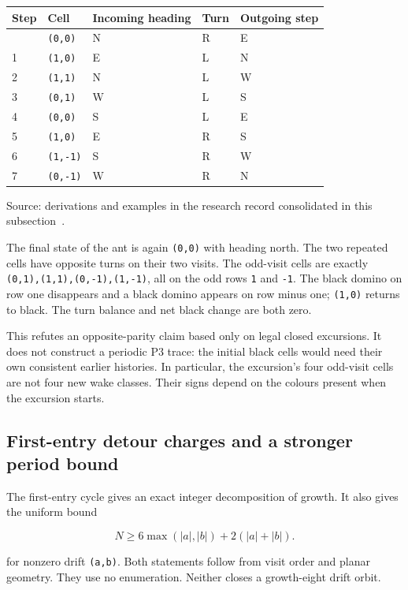 \documentclass[11pt,letterpaper]{article}
\theoremstyle{plain}
\theoremstyle{definition}
\begin{document}
\begin{NoHyper}
{\def\LTcaptype{table} %
\begin{longtable}[]{@{}lllll@{}}
\toprule\noalign{}
Step & Cell & Incoming heading & Turn & Outgoing step \\
\midrule\noalign{}
\endhead
\bottomrule\noalign{}
\endlastfoot
0 & \texttt{(0,0)} & N & R & E \\
1 & \texttt{(1,0)} & E & L & N \\
2 & \texttt{(1,1)} & N & L & W \\
3 & \texttt{(0,1)} & W & L & S \\
4 & \texttt{(0,0)} & S & L & E \\
5 & \texttt{(1,0)} & E & R & S \\
6 & \texttt{(1,-1)} & S & R & W \\
7 & \texttt{(0,-1)} & W & R & N \\
\end{longtable}
{\footnotesize Source: derivations and examples in the research record consolidated in this subsection~\cite{Repo}.\par}
}

The final state of the ant is again \texttt{(0,0)} with heading north. The two repeated cells have opposite turns on their two visits. The odd-visit cells are exactly \texttt{(0,1),(1,1),(0,-1),(1,-1)}, all on the odd rows \texttt{1} and \texttt{-1}. The black domino on row one disappears and a black domino appears on row minus one; \texttt{(1,0)} returns to black. The turn balance and net black change are both zero.

This refutes an opposite-parity claim based only on legal closed excursions. It does not construct a periodic P3 trace: the initial black cells would need their own consistent earlier histories. In particular, the excursion's four odd-visit cells are not four new wake classes. Their signs depend on the colours present when the excursion starts.


\subsection{First-entry detour charges and a stronger period bound}

The first-entry cycle gives an exact integer decomposition of growth. It also gives the uniform bound

\[
N\ge6\max(|a|,|b|)+2(|a|+|b|).
\]

for nonzero drift \texttt{(a,b)}. Both statements follow from visit order and planar geometry. They use no enumeration. Neither closes a growth-eight drift orbit.


\end{NoHyper}
\end{document}
